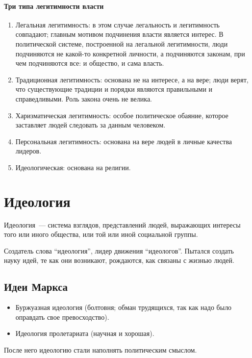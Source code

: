 \documentclass[12pt]{article}
\begin{document}
	\paragraph{Три типа легитимности власти}
	\begin{enumerate}
		\item Легальная легитимность: в этом случае легальность и легитимность совпадают; главным мотивом подчинения власти является интерес. В политической системе, построенной на легальной легитимности, люди подчиняются не какой-то конкретной личности, а подчиняются законам, при чем подчиняются все: и общество, и сама власть.
		\item Традиционная легитимность: основана не на интересе, а на вере; люди верят, что существующие традиции и порядки являются правильными и справедливыми. Роль закона очень не велика.
		\item Харизматическая легитимность: особое политическое обаяние, которое заставляет людей следовать за данным человеком.
		\item Персональная легитимность: основана на вере людей в личные качества лидеров.
		\item Идеологическая: основана на религии.
	\end{enumerate}
	\section{Идеология}
	\begin{definition}
		Идеология~--- система взглядов, представлений людей, выражающих интересы того или иного общества, или той или иной социальной группы.
	\end{definition}
	\begin{person}
		Создатель слова ``идеология'', лидер движения ``идеологов''. Пытался создать науку идей, те как они возникают, рождаются, как связаны с жизнью людей.
	\end{person}
	\subsection{Идеи Маркса}
	\begin{itemize}
		\item Буржуазная идеология (болтовня; обман трудящихся, так как надо было оправдать свое превосходство).
		\item Идеология пролетариата (научная и хорошая).
	\end{itemize}
	\begin{note}
		После него идеологию стали наполнять политическим смыслом.
	\end{note}
\end{document}
